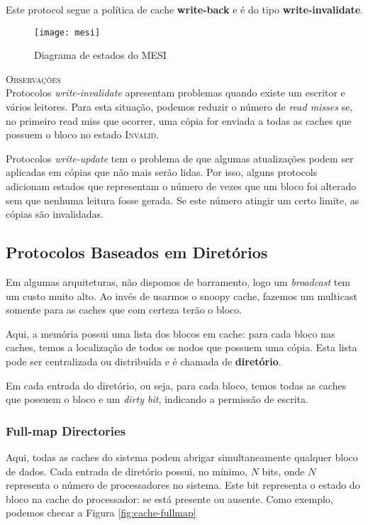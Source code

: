Este protocol segue a política de cache \textbf{write-back} e é do tipo \textbf{write-invalidate}.

\begin{figure}[ht]
  \centering
  \texttt{[image: mesi]}
  \label{fig:mesi-automata}
  \caption{Diagrama de estados do MESI}
\end{figure}


\textsc{Observações}\\
Protocolos \textit{write-invalidate} apresentam problemas quando existe um escritor e vários leitores. Para esta situação, podemos reduzir o número de \textit{read misses} se, no primeiro read miss que ocorrer, uma cópia for enviada a todas as caches que possuem o bloco no estado \textsc{Invalid}.

Protocolos \textit{write-update} tem o problema de que algumas atualizações podem ser aplicadas em cópias que não mais serão lidas. Por isso, alguns protocols adicionam estados que representam o número de vezes que um bloco foi alterado sem que nenhuma leitura fosse gerada. Se este número atingir um certo limite, as cópias são invalidadas.




\subsection{Protocolos Baseados em Diretórios}
Em algumas arquiteturas, não dispomos de barramento, logo um \textit{broadcast} tem um custo muito alto. Ao invés de usarmos o snoopy cache, fazemos um multicast somente para as caches que com certeza terão o bloco.

Aqui, a memória possui uma lista dos blocos em cache: para cada bloco nas caches, temos a localização de todos os nodos que possuem uma cópia. Esta lista pode ser centralizada ou distribuída e é chamada de \textbf{diretório}.

Em cada entrada do diretório, ou seja, para cada bloco, temos todas as caches que possuem o bloco e um \textit{dirty bit}, indicando a permissão de escrita.




\subsubsection{Full-map Directories}
Aqui, todas as caches do sistema podem abrigar simultaneamente qualquer bloco de dados. Cada entrada de diretório possui, no mínimo, $N$ bits, onde $N$ representa o número de processadores no sistema. Este bit representa o estado do bloco na cache do processador: se está presente ou ausente. Como exemplo, podemos checar a Figura \ref{fig:cache-fullmap}

